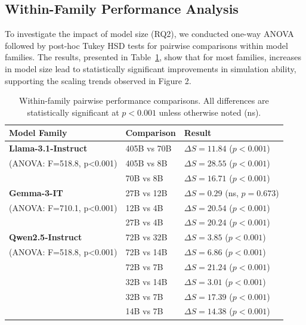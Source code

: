 \documentclass{article} %
\begin{document}
\subsection{Within-Family Performance Analysis}

To investigate the impact of model size (RQ2), we conducted one-way ANOVA followed by post-hoc Tukey HSD tests for pairwise comparisons within model families. The results, presented in Table~\ref{tab:family_stats}, show that for most families, increases in model size lead to statistically significant improvements in simulation ability, supporting the scaling trends observed in Figure 2.

\begin{table}[h!]
\centering
\caption{Within-family pairwise performance comparisons. All differences are statistically significant at $p<0.001$ unless otherwise noted (ns).}
\label{tab:family_stats}
\begin{tabular}{lll}
\toprule
\textbf{Model Family} & \textbf{Comparison} & \textbf{Result} \\
\midrule
\textbf{Llama-3.1-Instruct} & 405B vs 70B & $\Delta S = 11.84$ ($p<0.001$) \\
(ANOVA: F=518.8, p<0.001) & 405B vs 8B & $\Delta S = 28.55$ ($p<0.001$) \\
& 70B vs 8B & $\Delta S = 16.71$ ($p<0.001$) \\
\midrule
\textbf{Gemma-3-IT} & 27B vs 12B & $\Delta S = 0.29$ (ns, $p=0.673$) \\
(ANOVA: F=710.1, p<0.001) & 12B vs 4B & $\Delta S = 20.54$ ($p<0.001$) \\
& 27B vs 4B & $\Delta S = 20.24$ ($p<0.001$) \\
\midrule
\textbf{Qwen2.5-Instruct} & 72B vs 32B & $\Delta S = 3.85$ ($p<0.001$) \\
(ANOVA: F=518.8, p<0.001) & 72B vs 14B & $\Delta S = 6.86$ ($p<0.001$) \\
& 72B vs 7B & $\Delta S = 21.24$ ($p<0.001$) \\
& 32B vs 14B & $\Delta S = 3.01$ ($p<0.001$) \\
& 32B vs 7B & $\Delta S = 17.39$ ($p<0.001$) \\
& 14B vs 7B & $\Delta S = 14.38$ ($p<0.001$) \\
\bottomrule
\end{tabular}
\end{table}
\end{document}
